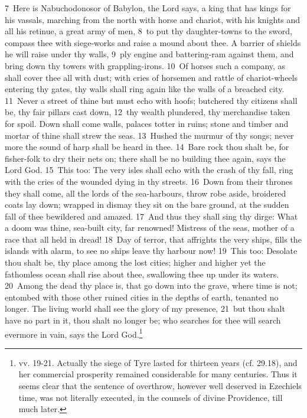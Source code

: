 \documentclass[10pt]{book} %
\begin{document}
\textcolor{benred8}{7}~Here is Nabuchodonosor of Babylon, the Lord says, a king that has kings for his vassals, marching from the north with horse and chariot, with his knights and all his retinue, a great army of men, \textcolor{benred8}{8}~to put thy daughter-towns to the sword, compass thee with siege-works and raise a mound about thee. A barrier of shields he will raise under thy walls, \textcolor{benred8}{9}~ply engine and battering-ram against them, and bring down thy towers with grappling-irons. \textcolor{benred8}{10}~Of horses such a company, as shall cover thee all with dust; with cries of horsemen and rattle of chariot-wheels entering thy gates, thy walls shall ring again like the walls of a breached city. \textcolor{benred8}{11}~Never a street of thine but must echo with hoofs; butchered thy citizens shall be, thy fair pillars cast down, \textcolor{benred8}{12}~thy wealth plundered, thy merchandise taken for spoil. Down shall come walls, palaces totter in ruins; stone and timber and mortar of thine shall strew the seas. \textcolor{benred8}{13}~Hushed the murmur of thy songs; never more the sound of harp shall be heard in thee. \textcolor{benred8}{14}~Bare rock thou shalt be, for fisher-folk to dry their nets on; there shall be no building thee again, says the Lord God.
\textcolor{benred8}{15}~This too: The very isles shall echo with the crash of thy fall, ring with the cries of the wounded dying in thy streets. \textcolor{benred8}{16}~Down from their thrones they shall come, all the lords of the sea-harbours, throw robe aside, broidered coats lay down; wrapped in dismay they sit on the bare ground, at the sudden fall of thee bewildered and amazed. \textcolor{benred8}{17}~And thus they shall sing thy dirge: What a doom was thine, sea-built city, far renowned! Mistress of the seas, mother of a race that all held in dread! \textcolor{benred8}{18}~Day of terror, that affrights the very ships, fills the islands with alarm, to see no ships leave thy harbour now!
\textcolor{benred8}{19}~This too: Desolate thou shalt be, thy place among the lost cities; higher and higher yet the fathomless ocean shall rise about thee, swallowing thee up under its waters. \textcolor{benred8}{20}~Among the dead thy place is, that go down into the grave, where time is not; entombed with those other ruined cities in the depths of earth, tenanted no longer. The living world shall see the glory of my presence, \textcolor{benred8}{21}~but thou shalt have no part in it, thou shalt no longer be; who searches for thee will search evermore in vain, says the Lord God.\footnote[2]{vv. 19-21. Actually the siege of Tyre lasted for thirteen years (cf. 29.18), and her commercial prosperity remained considerable for many centuries. Thus it seems clear that the sentence of overthrow, however well deserved in Ezechiel\textquotesingle s time, was not literally executed, in the counsels of divine Providence, till much later.}
\end{document}
